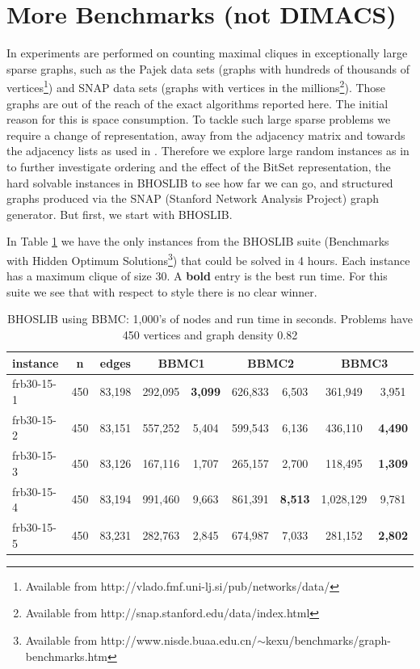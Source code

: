 \documentclass{l4proj}
\begin{document}
\section{More Benchmarks (not DIMACS)}
In \cite{eppstein2011} experiments are performed on counting maximal cliques in exceptionally
large sparse graphs, such as the Pajek data sets 
(graphs with hundreds of thousands of 
vertices\footnote{Available from http://vlado.fmf.uni-lj.si/pub/networks/data/}) and 
SNAP data sets  
(graphs with vertices in the millions\footnote{Available from http://snap.stanford.edu/data/index.html}). Those
graphs are out of the reach of the exact algorithms reported here. The initial reason for this is space consumption.
To tackle such large sparse problems we require a change of representation, away from the adjacency matrix
and towards the adjacency lists as used in \cite{eppstein2011}. Therefore we explore large random
instances as in \cite{segundo2011,tomita2010} to further investigate ordering and the effect of the BitSet representation,
the hard solvable instances in BHOSLIB to see how far we can go, and structured graphs produced via the SNAP 
(Stanford Network Analysis Project) graph generator. But first, we start with BHOSLIB.

In Table \ref{bhoslib} we have the only instances from the BHOSLIB suite 
(Benchmarks with Hidden Optimum Solutions\footnote{Available from http://www.nisde.buaa.edu.cn/$\sim$kexu/benchmarks/graph-benchmarks.htm})
that could be solved in 4 hours. Each instance has a maximum clique of size 30.
A {\bf bold} entry is the best run time. For this suite we see that with respect to style there is no clear winner.

\begin{table}
\begin{center}
\begin{tabular}{|l|c|c|c c|c c|c c|} \hline 
instance & n & edges & \multicolumn{2}{|c|}{BBMC1} & \multicolumn{2}{|c|}{BBMC2} & \multicolumn{2}{|c|}{BBMC3} \\ \hline
frb30-15-1 & 450 & 83,198 & 292,095 & \bf{3,099} & 626,833 & 6,503 & 361,949 & 3,951  \\ 
frb30-15-2 & 450 & 83,151 & 557,252 & 5,404 & 599,543 & 6,136 & 436,110 & \bf{4,490}  \\ 
frb30-15-3 & 450 & 83,126 & 167,116 & 1,707 & 265,157 & 2,700 & 118,495 & \bf{1,309}  \\ 
frb30-15-4 & 450 & 83,194 & 991,460 & 9,663 & 861,391 & \bf{8,513} & 1,028,129 & 9,781  \\ 
frb30-15-5 & 450 & 83,231& 282,763 & 2,845 & 674,987 & 7,033 & 281,152 & \bf{2,802}  \\ \hline
\end{tabular}
\end{center}
\caption{BHOSLIB using BBMC: 1,000's of nodes and run time in seconds. Problems have 450 vertices and graph density 0.82}
\label{bhoslib}
\end{table}
\end{document}

